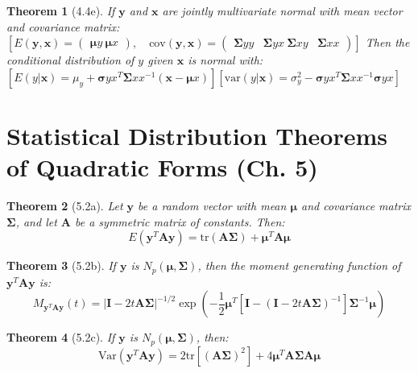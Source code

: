 \documentclass{article}
\newtheorem{theorem}{Theorem}[section]
\begin{document}
\begin{theorem}[4.4e]
If $\mathbf{y}$ and $\mathbf{x}$ are jointly multivariate normal with mean vector and covariance matrix:
$[E(\mathbf{y}, \mathbf{x}) = \begin{pmatrix} \boldsymbol{\mu}y \ \boldsymbol{\mu}x \end{pmatrix}, \quad
\text{cov}(\mathbf{y}, \mathbf{x}) = \begin{pmatrix} \boldsymbol{\Sigma}{yy} & \boldsymbol{\Sigma}{yx} \ \boldsymbol{\Sigma}{xy} & \boldsymbol{\Sigma}{xx} \end{pmatrix}]$
Then the conditional distribution of $y$ given $\mathbf{x}$ is normal with:
$[E(y|\mathbf{x}) = \mu_y + \boldsymbol{\sigma}{yx}^T\boldsymbol{\Sigma}{xx}^{-1}(\mathbf{x} - \boldsymbol{\mu}x)]
[\text{var}(y|\mathbf{x}) = \sigma_y^2 - \boldsymbol{\sigma}{yx}^T\boldsymbol{\Sigma}{xx}^{-1}\boldsymbol{\sigma}{yx}]$
\end{theorem}


\section{Statistical Distribution Theorems of Quadratic Forms (Ch. 5)}

\begin{theorem}[5.2a]
Let $\mathbf{y}$ be a random vector with mean $\boldsymbol{\mu}$ and covariance matrix $\boldsymbol{\Sigma}$, and let $\mathbf{A}$ be a symmetric matrix of constants. Then:
\[E(\mathbf{y}^T \mathbf{A} \mathbf{y}) = \text{tr}(\mathbf{A}\boldsymbol{\Sigma}) + \boldsymbol{\mu}^T \mathbf{A} \boldsymbol{\mu}\]
\end{theorem}
\begin{theorem}[5.2b]
If $\mathbf{y}$ is $N_p(\boldsymbol{\mu}, \boldsymbol{\Sigma})$, then the moment generating function of $\mathbf{y}^T\mathbf{A}\mathbf{y}$ is:
\[M_{\mathbf{y}^T\mathbf{A}\mathbf{y}}(t) = |\mathbf{I} - 2t\mathbf{A}\boldsymbol{\Sigma}|^{-1/2}\exp\left(-\frac{1}{2}\boldsymbol{\mu}^T[\mathbf{I} - (\mathbf{I} - 2t\mathbf{A}\boldsymbol{\Sigma})^{-1}]\boldsymbol{\Sigma}^{-1}\boldsymbol{\mu}\right)\]
\end{theorem}

\begin{theorem}[5.2c]
If $\mathbf{y}$ is $N_p(\boldsymbol{\mu}, \boldsymbol{\Sigma})$, then:
\[\text{Var}(\mathbf{y}^T\mathbf{A}\mathbf{y}) = 2\text{tr}[(\mathbf{A}\boldsymbol{\Sigma})^2] + 4\boldsymbol{\mu}^T\mathbf{A}\boldsymbol{\Sigma}\mathbf{A}\boldsymbol{\mu}\]
\end{theorem}
\end{document}
